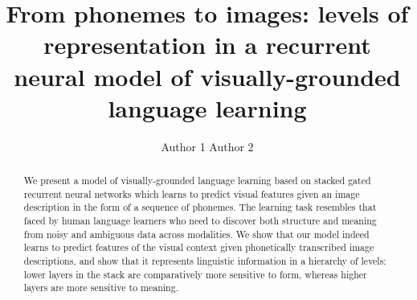 \documentclass[11pt]{article}
\title{From phonemes to images: levels of representation in a recurrent neural
model of visually-grounded language learning}
\author{Author 1 \And Author 2}
\date{}
\begin{document}
\setlength{\abovedisplayskip}{0.5em}
\setlength{\belowdisplayskip}{0.5em}
\setlength{\belowcaptionskip}{-10pt}
\maketitle
\begin{abstract}
We present a model of visually-grounded language learning based on stacked gated recurrent neural networks which learns to predict visual features given an image description in the form of a sequence of phonemes. The learning task resembles that faced by human language learners who need to discover both structure and meaning from noisy and ambiguous data across modalities. We show that our model indeed learns to predict features of the visual context given phonetically transcribed image descriptions, and show that it represents linguistic information in a hierarchy of levels: lower layers in the stack are comparatively more sensitive to form, whereas higher layers are more sensitive to meaning.
\end{abstract}












\end{document}
